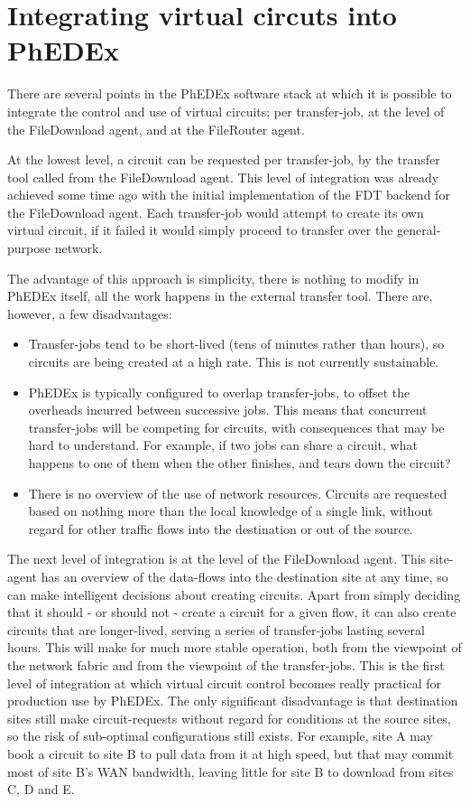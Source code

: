 \section{Integrating virtual circuts into PhEDEx}
There are several points in the PhEDEx software stack at which it is possible to integrate the control and use of virtual circuits; per transfer-job, at the level of the FileDownload agent, and at the FileRouter agent.

At the lowest level, a circuit can be requested per transfer-job, by the transfer tool called from the FileDownload agent. This level of integration was already achieved some time ago with the initial implementation of the FDT backend for the FileDownload agent. Each transfer-job would attempt to create its own virtual circuit, if it failed it would simply proceed to transfer over the general-purpose network.

The advantage of this approach is simplicity, there is nothing to modify in PhEDEx itself, all the work happens in the external transfer tool. There are, however, a few disadvantages:
\begin{itemize}
\item Transfer-jobs tend to be short-lived (tens of minutes rather than hours), so circuits are being created at a high rate. This is not currently sustainable.
\item PhEDEx is typically configured to overlap transfer-jobs, to offset the overheads incurred between successive jobs. This means that concurrent transfer-jobs will be competing for circuits, with consequences that may be hard to understand. For example, if two jobs can share a circuit, what happens to one of them when the other finishes, and tears down the circuit?
\item There is no overview of the use of network resources. Circuits are requested based on nothing more than the local knowledge of a single link, without regard for other traffic flows into the destination or out of the source.
\end{itemize}

The next level of integration is at the level of the FileDownload agent. This site-agent has an overview of the data-flows into the destination site at any time, so can make intelligent decisions about creating circuits. Apart from simply deciding that it should - or should not - create a circuit for a given flow, it can also create circuits that are longer-lived, serving a series of transfer-jobs lasting several hours. This will make for much more stable operation, both from the viewpoint of the network fabric and from the viewpoint of the transfer-jobs. This is the first level of integration at which virtual circuit control becomes really practical for production use by PhEDEx. The only significant disadvantage is that destination sites still make circuit-requests without regard for conditions at the source sites, so the risk of sub-optimal configurations still exists. For example, site A may book a circuit to site B to pull data from it at high speed, but that may commit most of site B's WAN bandwidth, leaving little for site B to download from sites C, D and E.

